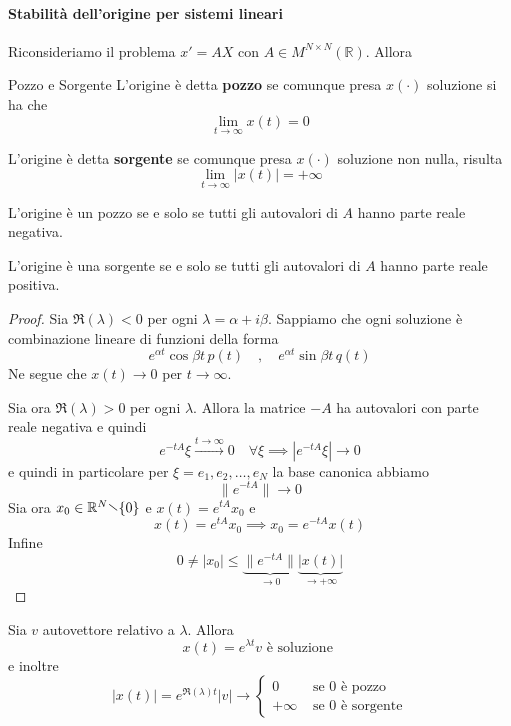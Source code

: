\paragraph{Stabilità dell'origine per sistemi lineari}
Riconsideriamo il problema \(x' = AX\) con \(A \in M^{N \times
N}{(\mathbb{R})}\). Allora
\begin{definition}{Pozzo e Sorgente}
    L'origine è detta \textbf{pozzo} se comunque presa \(x{(\cdot )}\) soluzione
    si ha che
    \[
      \lim_{t \to \infty} x{(t)} = 0
    \]
    
    L'origine è detta \textbf{sorgente} se comunque presa \(x{(\cdot )}\)
    soluzione non nulla, risulta
    \[
      \lim_{t \to \infty} |x{(t)}| = + \infty
    \]
\end{definition}

\begin{theorem}
    L'origine è un pozzo se e solo se tutti gli autovalori di \(A\) hanno parte
    reale negativa.

    L'origine è una sorgente se e solo se tutti gli autovalori di \(A\) hanno
    parte reale positiva.
\end{theorem}
\begin{proof}
    Sia \(\Re (\lambda) < 0\) per ogni \(\lambda = \alpha + i \beta\). Sappiamo
    che ogni soluzione è combinazione lineare di funzioni della forma 
    \[
      e^{\alpha t} \cos \beta t \, p{(t)} \quad, \quad e^{\alpha t} \sin \beta
      t \, q{(t)}
    \]
    Ne segue che \(x{(t)} \to  0\) per \(t \to \infty\).

    Sia ora \(\Re(\lambda) > 0\) per ogni \(\lambda \). Allora la matrice \(-A\)
    ha autovalori con parte reale negativa e quindi
    \[
      e^{-tA}\xi \overset{t \to \infty}{\longrightarrow} 0 \quad \forall \xi
      \implies \left| e^{-tA} \xi \right| \to 0
    \]
    e quindi in particolare per \(\xi = e_{1}, e_{2}, \dots, e_N\) la base
    canonica abbiamo
    \[
      \|e^{-tA}\| \to 0
    \]
    Sia ora \(x_{0} \in \mathbb{R}^{N} \sminus \{0\} \) e \(x{(t)} =
    e^{tA}x_{0}\) e 
    \[
      x{(t)} = e^{tA}x_{0} \implies x_{0} = e^{-tA} x{(t)} 
    \]
    Infine
    \[
        0 \neq |x_{0}| \le \underbrace{\|e^{-tA}\|}_{\to 0} \underbrace{
        |x{(t)}|}_{\to +\infty} 
    \]
\end{proof}
Sia \(v\) autovettore relativo a \(\lambda\). Allora
\[
  x{(t)} = e^{\lambda t}v \text{ è soluzione }
\]
e inoltre
\[
  |x{(t)}| = e^{\Re(\lambda) t}|v| \to \begin{cases}
      0 & \text{ se 0 è pozzo} \\
      +\infty & \text{ se 0 è sorgente}
  \end{cases}
\]

